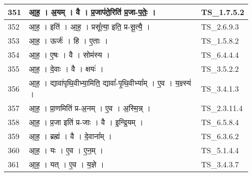 \documentclass[17pt]{extarticle}
\begin{document}
\begin{longtable}{||p{0.4in}||p{4.9in}||p{0.9in}||}
    \hline
        
    351 & आ॒ह॒   ।   अ॒यम्   ।   वै   ।   प्र॒जाप॑ते॒रिति॑ प्र॒जा{-}प॒तेः॒   ।    & TS\_1.7.5.2       \\
    
    \hline
        
    352 & आ॒ह॒   ।   इति॑   ।   आ॒ह॒   ।   प्रसू᳚त्या॒ इति॒ प्र{-}सू॒त्यै॒   ।    & TS\_2.6.9.3       \\
    
    \hline
        
    353 & आ॒ह॒   ।   ऊर्जः॑   ।   हि   ।   ए॒ताः   ।    & TS\_1.5.8.2       \\
    
    \hline
        
    354 & आ॒ह॒   ।   ए॒षः   ।   वै   ।   सोम॑स्य   ।    & TS\_6.4.4.4       \\
    
    \hline
        
    355 & आ॒ह॒   ।   दे॒वाः   ।   वै   ।   क्षयः॑   ।    & TS\_3.5.2.2       \\
    
    \hline
        
    356 & आ॒ह॒   ।   द्यावा॑पृथि॒वीभ्या॒मिति॒ द्यावा᳚{-}पृ॒थि॒वीभ्या᳚म्   ।   ए॒व   ।   य॒ज्ञ्स्य॑   ।    & TS\_3.4.1.3       \\
    
    \hline
        
    357 & आ॒ह॒   ।   प्रा॒णमिति॑ प्र{-}अ॒नम्   ।   ए॒व   ।   अ॒स्मि॒न्न्   ।    & TS\_2.3.11.4       \\
    
    \hline
        
    358 & आ॒ह॒   ।   प्र॒जा इति॑ प्र{-}जाः   ।   वै   ।   इ॒न्द्रि॒यम्   ।    & TS\_6.5.8.4       \\
    
    \hline
        
    359 & आ॒ह॒   ।   ब्रह्म॑   ।   वै   ।   दे॒वाना᳚म्   ।    & TS\_6.3.6.2       \\
    
    \hline
        
    360 & आ॒ह॒   ।   यः   ।   ए॒व   ।   ए॒न॒म्   ।    & TS\_5.1.4.4       \\
    
    \hline
        
    361 & आ॒ह॒   ।   यत्   ।   ए॒व   ।   य॒ज्ञे   ।    & TS\_3.4.3.7       \\
    

\end{longtable}
\end{document}
